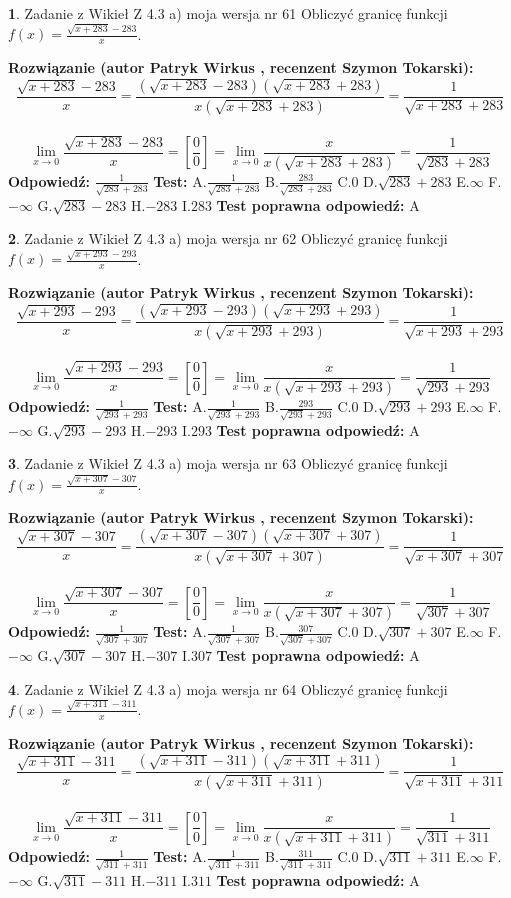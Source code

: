 \documentclass[12pt, a4paper]{article}
\theoremstyle{definition} %
\newtheorem{zad}{}
\newcommand{\zadStart}[1]{\begin{zad}#1\newline}
\newcommand{\zadStop}{\end{zad}}
\newcommand{\rozwStart}[2]{\noindent \textbf{Rozwiązanie (autor #1 , recenzent #2): }\newline}
\newcommand{\rozwStop}{\newline}
\newcommand{\odpStart}{\noindent \textbf{Odpowiedź:}\newline}
\newcommand{\odpStop}{\newline}
\newcommand{\testStart}{\noindent \textbf{Test:}\newline}
\newcommand{\testStop}{\newline}
\newcommand{\kluczStart}{\noindent \textbf{Test poprawna odpowiedź:}\newline}
\newcommand{\kluczStop}{\newline}
\begin{document}
\zadStart{Zadanie z Wikieł Z 4.3 a) moja wersja nr 61}
Obliczyć granicę funkcji $f(x)=\frac{\sqrt{x+283}-283}{x}$.
\zadStop
\rozwStart{Patryk Wirkus}{Szymon Tokarski}
$$\frac{\sqrt{x+283}-283}{x}=\frac{(\sqrt{x+283}-283)(\sqrt{x+283}+283)}{x(\sqrt{x+283}+283)}=\frac{1}{\sqrt{x+283}+283}$$
\\
$$\lim\limits_{x\to0}\frac{\sqrt{x+283}-283}{x}=[\frac{0}{0}]=
\lim\limits_{x\to0}\frac{x}{x(\sqrt{x+283}+283)} = \frac{1}{\sqrt{283}+283}$$
\rozwStop
\odpStart
$\frac{1}{\sqrt{283}+283}$
\odpStop
\testStart
A.$\frac{1}{\sqrt{283}+283}$
B.$\frac{283}{\sqrt{283}+283}$
C.$0$
D.$\sqrt{283}+283$
E.$\infty$
F.$-\infty$
G.$\sqrt{283}-283$
H.$-283$
I.$283$
\testStop
\kluczStart
A
\kluczStop



\zadStart{Zadanie z Wikieł Z 4.3 a) moja wersja nr 62}
Obliczyć granicę funkcji $f(x)=\frac{\sqrt{x+293}-293}{x}$.
\zadStop
\rozwStart{Patryk Wirkus}{Szymon Tokarski}
$$\frac{\sqrt{x+293}-293}{x}=\frac{(\sqrt{x+293}-293)(\sqrt{x+293}+293)}{x(\sqrt{x+293}+293)}=\frac{1}{\sqrt{x+293}+293}$$
\\
$$\lim\limits_{x\to0}\frac{\sqrt{x+293}-293}{x}=[\frac{0}{0}]=
\lim\limits_{x\to0}\frac{x}{x(\sqrt{x+293}+293)} = \frac{1}{\sqrt{293}+293}$$
\rozwStop
\odpStart
$\frac{1}{\sqrt{293}+293}$
\odpStop
\testStart
A.$\frac{1}{\sqrt{293}+293}$
B.$\frac{293}{\sqrt{293}+293}$
C.$0$
D.$\sqrt{293}+293$
E.$\infty$
F.$-\infty$
G.$\sqrt{293}-293$
H.$-293$
I.$293$
\testStop
\kluczStart
A
\kluczStop



\zadStart{Zadanie z Wikieł Z 4.3 a) moja wersja nr 63}
Obliczyć granicę funkcji $f(x)=\frac{\sqrt{x+307}-307}{x}$.
\zadStop
\rozwStart{Patryk Wirkus}{Szymon Tokarski}
$$\frac{\sqrt{x+307}-307}{x}=\frac{(\sqrt{x+307}-307)(\sqrt{x+307}+307)}{x(\sqrt{x+307}+307)}=\frac{1}{\sqrt{x+307}+307}$$
\\
$$\lim\limits_{x\to0}\frac{\sqrt{x+307}-307}{x}=[\frac{0}{0}]=
\lim\limits_{x\to0}\frac{x}{x(\sqrt{x+307}+307)} = \frac{1}{\sqrt{307}+307}$$
\rozwStop
\odpStart
$\frac{1}{\sqrt{307}+307}$
\odpStop
\testStart
A.$\frac{1}{\sqrt{307}+307}$
B.$\frac{307}{\sqrt{307}+307}$
C.$0$
D.$\sqrt{307}+307$
E.$\infty$
F.$-\infty$
G.$\sqrt{307}-307$
H.$-307$
I.$307$
\testStop
\kluczStart
A
\kluczStop



\zadStart{Zadanie z Wikieł Z 4.3 a) moja wersja nr 64}
Obliczyć granicę funkcji $f(x)=\frac{\sqrt{x+311}-311}{x}$.
\zadStop
\rozwStart{Patryk Wirkus}{Szymon Tokarski}
$$\frac{\sqrt{x+311}-311}{x}=\frac{(\sqrt{x+311}-311)(\sqrt{x+311}+311)}{x(\sqrt{x+311}+311)}=\frac{1}{\sqrt{x+311}+311}$$
\\
$$\lim\limits_{x\to0}\frac{\sqrt{x+311}-311}{x}=[\frac{0}{0}]=
\lim\limits_{x\to0}\frac{x}{x(\sqrt{x+311}+311)} = \frac{1}{\sqrt{311}+311}$$
\rozwStop
\odpStart
$\frac{1}{\sqrt{311}+311}$
\odpStop
\testStart
A.$\frac{1}{\sqrt{311}+311}$
B.$\frac{311}{\sqrt{311}+311}$
C.$0$
D.$\sqrt{311}+311$
E.$\infty$
F.$-\infty$
G.$\sqrt{311}-311$
H.$-311$
I.$311$
\testStop
\kluczStart
A
\kluczStop
\end{document}
